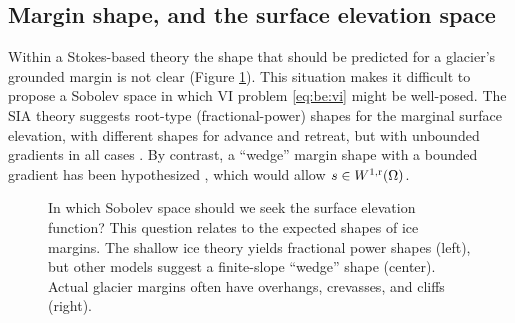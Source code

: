 \documentclass[hidelinks,onefignum,onetabnum,final]{siamart220329}  %
\newcommand{\rr}{{\text{\textnormal{r}}}}
\begin{document}
\subsection{Margin shape, and the surface elevation space} \label{subsec:margin}  Within a Stokes-based theory the shape that should be predicted for a glacier's grounded margin is not clear (Figure \ref{fig:margins}).  This situation makes it difficult to propose a Sobolev space in which VI problem \eqref{eq:be:vi} might be well-posed.  The SIA theory suggests root-type (fractional-power) shapes for the marginal surface elevation, with different shapes for advance and retreat, but with unbounded gradients in all cases \cite{Bueleretal2005,JouvetBueler2012}.  By contrast, a ``wedge'' margin shape with a bounded gradient has been hypothesized \cite[for example]{EchelmeyerKamb1986}, which would allow $s\in W^{1,\rr}(\Omega)$.

\begin{figure}[ht]
\begin{center}
\end{center}

\vspace{-2mm}

\caption{In which Sobolev space should we seek the surface elevation function?  This question relates to the expected shapes of ice margins.  The shallow ice theory yields fractional power shapes (left), but other models suggest a finite-slope ``wedge'' shape (center).  Actual glacier margins often have overhangs, crevasses, and cliffs (right).}
\label{fig:margins}
\end{figure}
\end{document}

